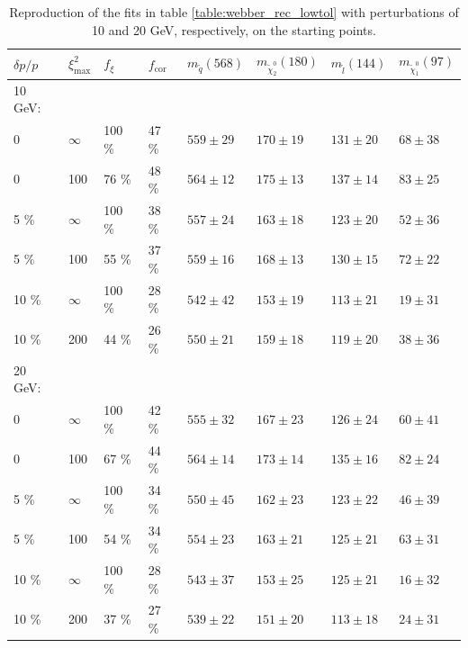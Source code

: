 \documentclass[twoside,english]{uiofysmaster}
\begin{document}


\begin{table}[hbt]
	\centering
	\begin{tabular}{| l | l | l | l  || l | l | l | l |}
		\hline
		$\delta p/p$ & $\xi^2_\mathrm{max}$ & $f_\xi$ & $f_\mathrm{cor}$ & $m_{\tilde q} (568)$ & $m_{\tilde \chi_2^0} (180)$ & $m_{\tilde l} (144)$ & $m_{\tilde \chi_1^0} (97)$ \\
		\hline \hline
		10 GeV: & & & & & & & \\ 
		\hline
		0 & 	$\infty$ &	100 \%	& 47 \%	& $559 \pm 29$	&	$170 \pm 19$	&	$131 \pm 20$	& 	$68 \pm 38$	\\
		0 &		100 &		76 \%	& 48 \% & $564 \pm 12$	&	$175 \pm 13$		&	$137 \pm 14$	&	$83 \pm 25$	\\
		5 \% &	$\infty$ &	100 \%	& 38 \% & $557 \pm 24$	& 	$163 \pm 18$	&	$123 \pm 20$&	$52 \pm 36$ \\
		5 \% &	100 &		55 \%	& 37 \% & $559 \pm 16$	&	$168 \pm 13$	& 	$130 \pm 15$	&	$72 \pm 22$	\\
		10 \% &	$\infty$ &	100 \%	& 28 \% & $542 \pm 42$	&	$153 \pm 19$	&	$113 \pm 21$&	$19 \pm 31$	\\
		10 \% &	200 &		44 \%	& 26 \% & $550 \pm 21$	& 	$159 \pm 18$	&	$119 \pm 20$&	$38 \pm 36$ \\
		\hline
		20 GeV: & & & & & & & \\ 
		\hline
		0 & 	$\infty$ &	100 \%	& 42 \%	& $555 \pm 32$	&	$167 \pm 23$	&	$126 \pm 24$	& 	$60 \pm 41$	\\
		0 &		100 &		67 \%	& 44 \% & $564 \pm 14$	&	$173 \pm 14$	&	$135 \pm 16$	&	$82 \pm 24$	\\
		5 \% &	$\infty$ &	100 \%	& 34 \% & $550 \pm 45$	& 	$162 \pm 23$	&	$123 \pm 22$&	$46 \pm 39$ \\
		5 \% &	100 &		54 \%	& 34 \% & $554 \pm 23$	&	$163 \pm 21$	& 	$125 \pm 21$	&	$63 \pm 31$	\\
		10 \% &	$\infty$ &	100 \%	& 28 \% & $543 \pm 37$	&	$153 \pm 25$	&	$125 \pm 21$&	$16 \pm 32$	\\
		10 \% &	200 &		37 \%	& 27 \% & $539 \pm 22$	& 	$151 \pm 20$	&	$113 \pm 18$&	$24 \pm 31$ \\
		\hline
	\end{tabular}
	\caption{Reproduction of the fits in table \ref{table:webber_rec_lowtol} with perturbations of 10 and 20 GeV, respectively, on the starting points.}
	\label{table:webber_rec_lowtol_perturbedSP}
\end{table}
\end{document}

